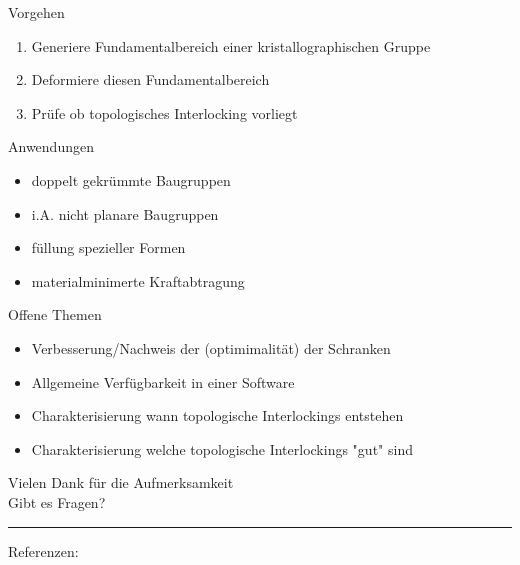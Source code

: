 \documentclass{beamer}
\theoremstyle{plain}
\begin{document}
\begin{frame}
    \begin{block}{Vorgehen}
        \begin{enumerate}[label=(\roman*)]
            \item Generiere Fundamentalbereich einer kristallographischen Gruppe
            \item Deformiere diesen Fundamentalbereich
            \item Prüfe ob topologisches Interlocking vorliegt
        \end{enumerate}
    \end{block}
\end{frame}

\begin{frame}
    \begin{exampleblock}{Anwendungen}
        \begin{itemize}[label=\textbullet]
            \item doppelt gekrümmte Baugruppen
            \item i.A. nicht planare Baugruppen
            \item füllung spezieller Formen
            \item materialminimerte Kraftabtragung
        \end{itemize}
    \end{exampleblock}
\end{frame}

\begin{frame}
    \begin{block}{Offene Themen}
        \begin{itemize}[label=\textbullet]
            \item Verbesserung/Nachweis der (optimimalität) der Schranken
            \item Allgemeine Verfügbarkeit in einer Software
            \item Charakterisierung wann topologische Interlockings entstehen
            \item Charakterisierung welche topologische Interlockings "gut" sind
        \end{itemize}
    \end{block}
\end{frame}


\begin{frame}
    \begin{center}
        Vielen Dank für die Aufmerksamkeit \\ 
        Gibt es Fragen?
    \end{center}
    \vspace{1em}
    \hrule
    \vspace{1em}
    Referenzen:
    \printbibliography
\end{frame}
\end{document}
